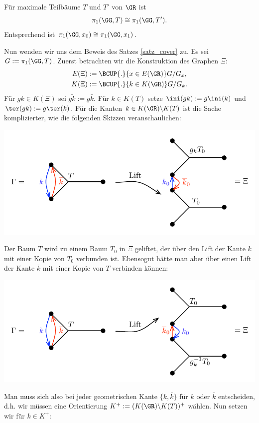 \FOLG Für maximale Teilbäume $T$ und $T'$ von $\GR$ ist
\[
\pi_1(\GG,T) \cong \pi_1(\GG,T').
\]
Entsprechend ist $\pi_1(\GG,x_0)\cong\pi_1(\GG,x_1)$.

Nun wenden wir uns dem Beweis des Satzes \ref{satz_cover} zu.
Es sei $G:= \pi_1(\GG,T)$.
Zuerst betrachten wir die Konstruktion des Graphen $\Xi$:
\begin{align*}
E(\Xi) &:= \BCUP{.}{x\in E(\GR)} G/G_x, \\
K(\Xi) &:= \BCUP{.}{k\in K(\GR)} G/G_k.
\end{align*}
Für $gk\in K(\Xi)$ sei $\bar{gk}:=g\bar{k}$.
Für $k\in K(T)$ setze $\ini(gk):=g\ini(k)$ und
$\ter(gk):=g\ter(k)$.
Für die Kanten $k\in K(\GR)\backslash K(T)$ ist die Sache 
komplizierter, wie die folgenden Skizzen veranschaulichen:
\begin{center}
	\includegraphics{grugraImages/T01}
\end{center}
Der Baum $T$ wird zu einem Baum $T_0$ in $\Xi$ geliftet, der
über den Lift der Kante $k$ mit einer Kopie von $T_0$ verbunden ist.
Ebensogut hätte man aber über einen Lift der Kante $\bar{k}$
mit einer Kopie von $T$ verbinden können:
\begin{center}
	\includegraphics{grugraImages/T02}
\end{center}
Man muss sich also bei jeder geometrischen Kante $\{k,\bar{k}\}$
für $k$ oder $\bar{k}$ entscheiden, d.h. wir müssen eine Orientierung
$K^+ := (K(\GR)\backslash K(T))^+$ wählen.
Nun setzen wir für $k\in K^+$:
